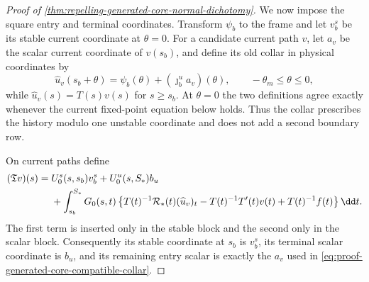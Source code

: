 \begin{proof}[Proof of
\cref{thm:repelling-generated-core-normal-dichotomy}]
We now impose the square entry and terminal coordinates.  Transform
\(\psi_b\) to the frame and let \(v_b^s\) be its stable current
coordinate at \(\theta=0\).  For a candidate current path \(v\), let
\(a_v\) be the scalar current coordinate of \(v(s_b)\), and define its
old collar in physical coordinates by
\begin{equation}
 \widehat u_v(s_b+\theta)
 =\psi_b(\theta)+(\jmath_b^ua_v)(\theta),
 \qquad-\theta_m\le\theta\le0,                  \label{eq:proof-generated-core-compatible-collar}
\end{equation}
while \(\widehat u_v(s)=T(s)v(s)\) for \(s\ge s_b\).  At
\(\theta=0\) the two definitions agree exactly whenever the current
fixed-point equation below holds.  Thus the collar prescribes the history
modulo one unstable coordinate and does not add a second boundary row.

On current paths define
\begin{align}
 (\mathfrak T v)(s)
 ={}&U_0^s(s,s_b)v_b^s
     +U_0^u(s,S_*)b_u\notag\\
 &+\int_{s_b}^{S_*}G_0(s,t)
   \left\{T(t)^{-1}
      \mathcal R_*(t)(\widehat u_v)_t
      -T(t)^{-1}T'(t)v(t)
      +T(t)^{-1}f(t)\right\}\dd t .             \label{eq:proof-generated-core-fixed-point}
\end{align}
The first term is inserted only in the stable block and the second only
in the scalar block.  Consequently its stable coordinate at \(s_b\) is
\(v_b^s\), its terminal scalar coordinate is \(b_u\), and its remaining
entry scalar is exactly the \(a_v\) used in
\cref{eq:proof-generated-core-compatible-collar}.


\end{proof}
